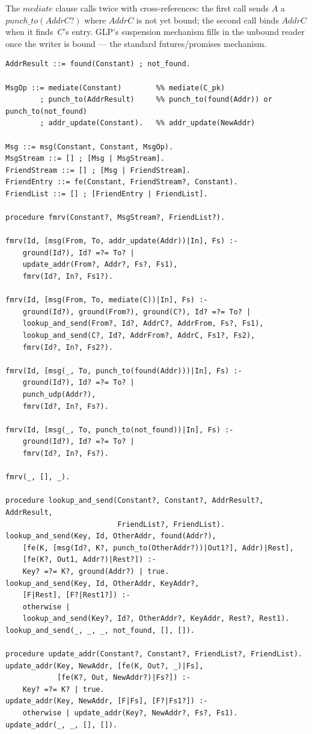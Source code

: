 The $\mathit{mediate}$ clause calls  twice with cross-references: the first call sends $A$ a $\mathit{punch\_to}(\mathit{AddrC}?)$ where $\mathit{AddrC}$ is not yet bound; the second call binds $\mathit{AddrC}$ when it finds~$C$'s entry.  GLP's suspension mechanism fills in the unbound reader once the writer is bound --- the standard futures/promises mechanism.

\begin{verbatim}
AddrResult ::= found(Constant) ; not_found.

MsgOp ::= mediate(Constant)        %% mediate(C_pk)
        ; punch_to(AddrResult)     %% punch_to(found(Addr)) or punch_to(not_found)
        ; addr_update(Constant).   %% addr_update(NewAddr)

Msg ::= msg(Constant, Constant, MsgOp).
MsgStream ::= [] ; [Msg | MsgStream].
FriendStream ::= [] ; [Msg | FriendStream].
FriendEntry ::= fe(Constant, FriendStream?, Constant).
FriendList ::= [] ; [FriendEntry | FriendList].

procedure fmrv(Constant?, MsgStream?, FriendList?).

fmrv(Id, [msg(From, To, addr_update(Addr))|In], Fs) :-
    ground(Id?), Id? =?= To? |
    update_addr(From?, Addr?, Fs?, Fs1),
    fmrv(Id?, In?, Fs1?).

fmrv(Id, [msg(From, To, mediate(C))|In], Fs) :-
    ground(Id?), ground(From?), ground(C?), Id? =?= To? |
    lookup_and_send(From?, Id?, AddrC?, AddrFrom, Fs?, Fs1),
    lookup_and_send(C?, Id?, AddrFrom?, AddrC, Fs1?, Fs2),
    fmrv(Id?, In?, Fs2?).

fmrv(Id, [msg(_, To, punch_to(found(Addr)))|In], Fs) :-
    ground(Id?), Id? =?= To? |
    punch_udp(Addr?),
    fmrv(Id?, In?, Fs?).

fmrv(Id, [msg(_, To, punch_to(not_found))|In], Fs) :-
    ground(Id?), Id? =?= To? |
    fmrv(Id?, In?, Fs?).

fmrv(_, [], _).

procedure lookup_and_send(Constant?, Constant?, AddrResult?, AddrResult,
                          FriendList?, FriendList).
lookup_and_send(Key, Id, OtherAddr, found(Addr?),
    [fe(K, [msg(Id?, K?, punch_to(OtherAddr?))|Out1?], Addr)|Rest],
    [fe(K?, Out1, Addr?)|Rest?]) :-
    Key? =?= K?, ground(Addr?) | true.
lookup_and_send(Key, Id, OtherAddr, KeyAddr?,
    [F|Rest], [F?|Rest1?]) :-
    otherwise |
    lookup_and_send(Key?, Id?, OtherAddr?, KeyAddr, Rest?, Rest1).
lookup_and_send(_, _, _, not_found, [], []).

procedure update_addr(Constant?, Constant?, FriendList?, FriendList).
update_addr(Key, NewAddr, [fe(K, Out?, _)|Fs],
            [fe(K?, Out, NewAddr?)|Fs?]) :-
    Key? =?= K? | true.
update_addr(Key, NewAddr, [F|Fs], [F?|Fs1?]) :-
    otherwise | update_addr(Key?, NewAddr?, Fs?, Fs1).
update_addr(_, _, [], []).
\end{verbatim}

